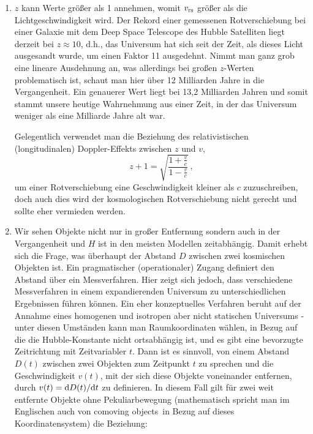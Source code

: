 \begin{enumerate}
\item
$z$ kann Werte gr\"o\ss er als 1 annehmen, womit $v_{\rm rs}$ gr\"o\ss er als die Lichtgeschwindigkeit
wird. Der Rekord einer gemessenen Rotverschiebung bei einer Galaxie mit dem Deep Space Telescope des
Hubble Satelliten liegt derzeit bei $z\approx 10$, d.h.,
das Universum hat sich seit der Zeit, als dieses Licht ausgesandt wurde, um einen Faktor 11 ausgedehnt. 
Nimmt man ganz grob eine lineare Ausdehnung an, was allerdings bei gro\ss en $z$-Werten problematisch
ist, schaut man hier \"uber 12 Milliarden Jahre in die Vergangenheit. Ein genauerer Wert liegt bei 13,2 
Milliarden Jahren und somit stammt unsere heutige Wahrnehmung aus einer Zeit, in der das Universum 
weniger als eine Milliarde Jahre alt war. 

Gelegentlich verwendet man die Beziehung des relativistischen (longitudinalen) Doppler-Effekts 
zwischen $z$ und $v$,
\begin{equation}
               z+1 = \sqrt{ \frac{ 1 + \frac{v}{c}}{1-\frac{v}{c}}}  \, ,                     
\end{equation} 
um einer Rotverschiebung eine Geschwindigkeit kleiner als $c$ zuzuschreiben, doch auch dies
wird der kosmologischen Rotverschiebung nicht gerecht und sollte eher vermieden werden. 
\item
Wir sehen Objekte nicht nur in gro\ss er Entfernung sondern
auch in der Vergangenheit und $H$ ist in den meisten Modellen zeitabh\"angig. Damit erhebt sich
die Frage, was \"uberhaupt der Abstand $D$ zwischen zwei kosmischen Objekten ist. Ein pragmatischer
(operationaler) Zugang definiert den Abstand \"uber ein Messverfahren. Hier zeigt sich jedoch, dass
verschiedene Messverfahren in einem expandierenden Universum zu unterschiedlichen Ergebnissen
f\"uhren k\"onnen. Ein eher konzeptuelles Verfahren beruht auf der Annahme eines homogenen und
isotropen aber nicht statischen Universums - unter diesen Umst\"anden kann man Raumkoordinaten
w\"ahlen, in Bezug auf die die Hubble-Konstante nicht 
ortsabh\"angig ist, und es gibt eine bevorzugte Zeitrichtung mit Zeitvariabler $t$. Dann ist es sinnvoll, von
einem Abstand $D(t)$ zwischen zwei Objekten zum Zeitpunkt $t$ zu sprechen und die Geschwindigkeit
$v(t)$, mit der sich diese Objekte voneinander entfernen, durch $v(t)= {\rm d}D(t)/{\rm d}t$ zu
definieren. In diesem Fall gilt f\"ur zwei weit entfernte Objekte ohne Pekuliarbewegung (mathematisch
spricht man im Englischen auch von 
\glqq comoving objects\grqq\ in Bezug auf dieses Koordinatensystem) die Beziehung:

\end{enumerate}
